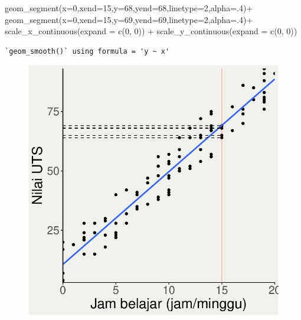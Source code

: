 \documentclass[
  letterpaper,
  DIV=11,
  numbers=noendperiod]{scrartcl}
\newenvironment{Shaded}{\begin{snugshade}}{\end{snugshade}}
\newcommand{\AttributeTok}[1]{\textcolor[rgb]{0.40,0.45,0.13}{#1}}
\newcommand{\DecValTok}[1]{\textcolor[rgb]{0.68,0.00,0.00}{#1}}
\newcommand{\FunctionTok}[1]{\textcolor[rgb]{0.28,0.35,0.67}{#1}}
\newcommand{\NormalTok}[1]{\textcolor[rgb]{0.00,0.23,0.31}{#1}}
\newcommand{\SpecialCharTok}[1]{\textcolor[rgb]{0.37,0.37,0.37}{#1}}
\begin{document}
\begin{Shaded}
\begin{Highlighting}[]
  \FunctionTok{geom\_segment}\NormalTok{(}\AttributeTok{x=}\DecValTok{0}\NormalTok{,}\AttributeTok{xend=}\DecValTok{15}\NormalTok{,}\AttributeTok{y=}\DecValTok{68}\NormalTok{,}\AttributeTok{yend=}\DecValTok{68}\NormalTok{,}\AttributeTok{linetype=}\DecValTok{2}\NormalTok{,}\AttributeTok{alpha=}\NormalTok{.}\DecValTok{4}\NormalTok{)}\SpecialCharTok{+}
  \FunctionTok{geom\_segment}\NormalTok{(}\AttributeTok{x=}\DecValTok{0}\NormalTok{,}\AttributeTok{xend=}\DecValTok{15}\NormalTok{,}\AttributeTok{y=}\DecValTok{69}\NormalTok{,}\AttributeTok{yend=}\DecValTok{69}\NormalTok{,}\AttributeTok{linetype=}\DecValTok{2}\NormalTok{,}\AttributeTok{alpha=}\NormalTok{.}\DecValTok{4}\NormalTok{)}\SpecialCharTok{+}
  \FunctionTok{scale\_x\_continuous}\NormalTok{(}\AttributeTok{expand =} \FunctionTok{c}\NormalTok{(}\DecValTok{0}\NormalTok{, }\DecValTok{0}\NormalTok{)) }\SpecialCharTok{+} \FunctionTok{scale\_y\_continuous}\NormalTok{(}\AttributeTok{expand =} \FunctionTok{c}\NormalTok{(}\DecValTok{0}\NormalTok{, }\DecValTok{0}\NormalTok{))}
\end{Highlighting}
\end{Shaded}

\begin{verbatim}
`geom_smooth()` using formula = 'y ~ x'
\end{verbatim}

\begin{figure}[H]

{\centering \includegraphics{index_files/figure-pdf/unnamed-chunk-22-1.pdf}

}

\end{figure}
\end{document}
